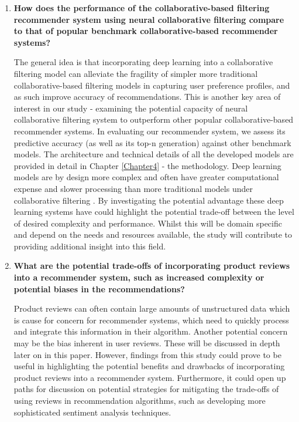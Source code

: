 \begin{enumerate}
    \item \textbf{How does the performance of the collaborative-based filtering recommender system using neural collaborative filtering compare to that of popular benchmark collaborative-based recommender systems?} 
    
    The general idea is that incorporating deep learning into a collaborative filtering model can alleviate the fragility of simpler more traditional collaborative-based filtering models in capturing user preference profiles, and as such improve accuracy of recommendations. This is another key area of interest in our study - examining the potential capacity of neural collaborative filtering system to outperform other popular collaborative-based recommender systems. In evaluating our recommender system, we assess its predictive accuracy (as well as its top-n generation) against other benchmark models. The architecture and technical details of all the developed models are provided in detail in Chapter \ref{Chapter4} - the methodology.  Deep learning models are by design more complex and often have greater computational expense and slower processing than more traditional models under collaborative filtering \cite{he2017neural}. By investigating the potential advantage these deep learning systems have could highlight the potential trade-off between the level of desired complexity and performance. Whilst this will be domain specific and depend on the needs and resources available, the study will contribute to providing additional insight into this field. 
    
    \item \textbf{What are the potential trade-offs of incorporating product reviews into a recommender system, such as increased complexity or potential biases in the recommendations?} 
    
    Product reviews can often contain large amounts of unstructured data which is cause for concern for recommender systems, which need to quickly process and integrate this information in their algorithm. Another potential concern may be the bias inherent in user reviews. These will be discussed in depth later on in this paper. However, findings from this study could prove to be useful in highlighting the potential benefits and drawbacks of incorporating product reviews into a recommender system. Furthermore, it could open up paths for discussion on potential strategies for mitigating the trade-offs of using reviews in recommendation algorithms, such as developing more sophisticated sentiment analysis techniques. 
\end{enumerate}

